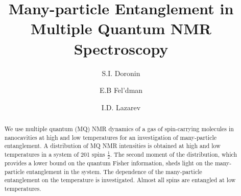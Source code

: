 \documentclass[
    pra,  
    twocolumn, 
    floatfix, 
    amsmath, 
    amssymb, 
    superscriptaddress
]{revtex4-1}
\begin{document}

\title{Many-particle Entanglement in Multiple Quantum NMR Spectroscopy} 

\author{S.I. Doronin}
\author{E.B Fel'dman}
\author{I.D. Lazarev}



\begin{abstract}
We use multiple quantum (MQ) NMR dynamics of a gas of spin-carrying molecules in nanocavities at high and low temperatures for an investigation of many-particle entanglement. 
A distribution of MQ NMR intensities is obtained at high and low temperatures in a system  of 201 spins $\frac 1 2$. 
The second moment of the distribution, which provides a lower bound on the quantum Fisher information, sheds light on the many-particle entanglement in the system. 
The dependence of the many-particle entanglement on the temperature is investigated.  
Almost all spins are entangled at low temperatures.

\end{abstract}

\maketitle

\end{document}
